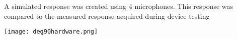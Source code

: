\documentclass[landscape,a1paper,fontscale=0.5]{baposter} %
\begin{document}
\begin{poster}
{A simulated response was created using 4 microphones. This response was compared to the measured response acquired during device testing
	\begin{center}
		\texttt{[image: deg90hardware.png]}
	\end{center}

	
}



\end{poster}
\end{document}
